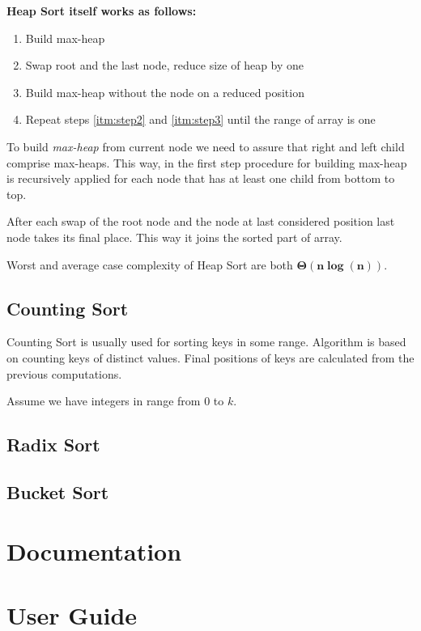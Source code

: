 \documentclass[
  field=inf,
  biblatex,
  language=english,
  glossaries,
  index
]{kidiplom}
\begin{document}
\textbf{Heap Sort itself works as follows:}
\begin{enumerate}
 \item \label{itm:step1} Build max-heap
 \item \label{itm:step2} Swap root and the last node, reduce size of heap by one
 \item \label{itm:step3} Build max-heap without the node on a reduced position
 \item Repeat steps \ref{itm:step2} and \ref{itm:step3} until the range of array is one
\end{enumerate}

To build \textit{max-heap} from current node we need to assure that right and left child comprise max-heaps. This way, in the first step procedure for building max-heap is recursively applied for each node that has at least one child from bottom to top.

After each swap of the root node and the node at last considered position last node takes its final place. This way it joins the sorted part of array.

Worst and average case complexity of Heap Sort are both $\bm{\Theta(n \log(n))}$.

\subsection{Counting Sort}

Counting Sort is usually used for sorting keys in some range. Algorithm is based on counting keys of distinct values. Final positions of keys are calculated from the previous computations.

Assume we have integers in range from $0$ to $k$.

\subsection{Radix Sort}

\subsection{Bucket Sort}

\section{Documentation}

\section{User Guide}
\end{document}
